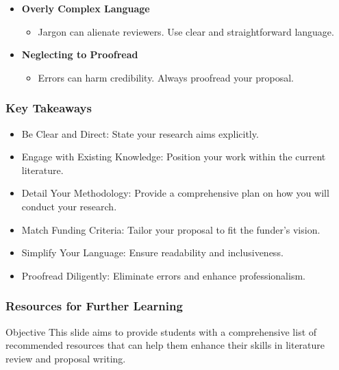 \documentclass[aspectratio=169]{beamer}
\begin{document}
\begin{frame}[fragile]
\begin{itemize}
        \item \textbf{Overly Complex Language}
            \begin{itemize}
                \item Jargon can alienate reviewers. Use clear and straightforward language.
            \end{itemize}
        
        \item \textbf{Neglecting to Proofread}
            \begin{itemize}
                \item Errors can harm credibility. Always proofread your proposal.
            \end{itemize}
    \end{itemize}
\end{frame}

\begin{frame}[fragile]
    \frametitle{Key Takeaways}
    \begin{itemize}
        \item Be Clear and Direct: State your research aims explicitly.
        \item Engage with Existing Knowledge: Position your work within the current literature.
        \item Detail Your Methodology: Provide a comprehensive plan on how you will conduct your research.
        \item Match Funding Criteria: Tailor your proposal to fit the funder's vision.
        \item Simplify Your Language: Ensure readability and inclusiveness.
        \item Proofread Diligently: Eliminate errors and enhance professionalism.
    \end{itemize}
\end{frame}

\begin{frame}[fragile]
    \frametitle{Resources for Further Learning}
    \begin{block}{Objective}
        This slide aims to provide students with a comprehensive list of recommended resources that can help them enhance their skills in literature review and proposal writing.
    \end{block}
\end{frame}
\end{document}
